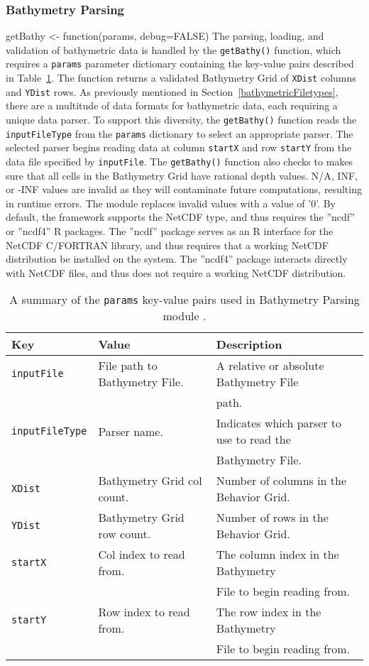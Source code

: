 \subsubsection{Bathymetry Parsing}
getBathy <- function(params, debug=FALSE) 
The parsing, loading, and validation of bathymetric data is handled by the \texttt{getBathy()} function, which requires a \texttt{params} parameter dictionary containing the key-value pairs described in Table~\ref{bathyParams}.  The function returns a validated Bathymetry Grid of \texttt{XDist} columns and \texttt{YDist} rows.  As previously mentioned in Section~\ref{bathymetricFiletypes}, there are a multitude of data formats for bathymetric data, each requiring a unique data parser.  To support this diversity, the \texttt{getBathy()} function reads the \texttt{inputFileType} from the \texttt{params} dictionary to select an appropriate parser.  The selected parser begins reading data at column \texttt{startX} and row \texttt{startY} from the data file specified by \texttt{inputFile}.  The \texttt{getBathy()} function also checks to makes sure that all cells in the Bathymetry Grid have rational depth values.  N/A, INF, or -INF values are invalid as they will contaminate future computations, resulting in runtime errors.  The module replaces invalid values with a value of '0'.  By default, the framework supports the NetCDF type, and thus requires the ''ncdf'' or ''ncdf4'' R packages.  The ''ncdf'' package serves as an R interface for the NetCDF C/FORTRAN library, and thus requires that a working NetCDF distribution be installed on the system.  The ''ncdf4'' package interacts directly with NetCDF files, and thus does not require a working NetCDF distribution.  

\begin{table}[ht]
	\begin{tabular}{l l l}
		Key						&	Value 								&	Description\\
		\hline
		\texttt{inputFile}		& 	File path to Bathymetry File.		&	A relative or absolute Bathymetry File\\
								&										&	path.\\
		\texttt{inputFileType}	& 	Parser name.						&	Indicates which parser to use to read the \\
								&										&	Bathymetry File.\\
		\texttt{XDist}			&	Bathymetry Grid col count.			&	Number of columns in the Behavior Grid.\\
		\texttt{YDist}			&	Bathymetry Grid row count.			&	Number of rows in the Behavior 	Grid.\\		
		\texttt{startX}			& 	Col index to read from. 			& 	The column index in the Bathymetry\\
								&										&   File to	begin reading from.\\
		\texttt{startY}			& 	Row index to read from.				&	The row index in the Bathymetry\\
								&										&	File to begin reading from.\\
	\end{tabular}
	\caption{A summary of the \texttt{params} key-value pairs used in Bathymetry Parsing module .
		\label{bathyParams}}
\end{table}

